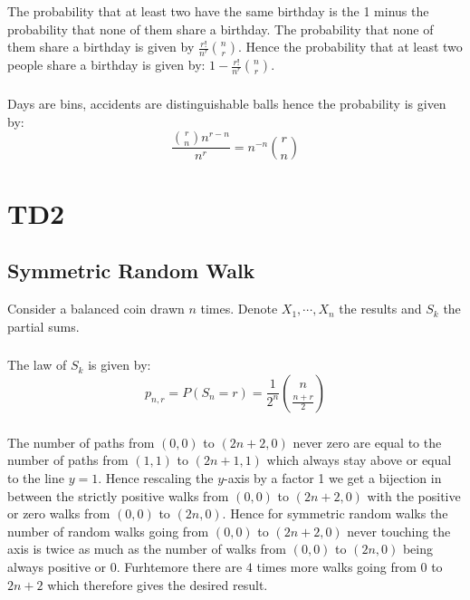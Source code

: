 \documentclass[10pt,a4paper]{book}
\begin{document}
\subsection{}
The probability that at least two have the same birthday is the 1 minus the probability that none of them share a birthday. The probability that none of them share a birthday is given by $\frac{r!}{n^r}\binom{n}{r}$. Hence the probability that at least two people share a birthday is given by: $1 - \frac{r!}{n^r} \binom{n}{r}$.

\subsection{}
Days are bins, accidents are distinguishable balls hence the probability is given by:
\[
\frac{\binom{r}{n} n^{r - n}}{n^r}  = n^{-n} \binom{r}{n}
\]

\subsection{}


\chapter{TD2}

\section{Symmetric Random Walk}
Consider a balanced coin drawn $n$ times. Denote $X_1, \cdots, X_n$ the results and $S_k$ the partial sums. 
\subsection{}
The law of $S_k$ is given by:
\[
p_{n,r} = P(S_n = r) = \frac{1}{2^n} \binom{n}{\frac{n + r}{2}}
\]

\subsection{}
The number of paths from $(0, 0)$ to $(2n +2, 0)$ never zero are equal to the number of paths from $(1, 1)$ to $(2n + 1, 1)$ which always stay above or equal to the line $y = 1$. Hence rescaling the $y$-axis by a factor 1 we get a bijection in between the strictly positive walks from $(0, 0)$ to $(2n +2, 0)$ with the positive or zero walks from $(0, 0)$ to $(2n, 0)$.
Hence for symmetric random walks the number of random walks going from $(0,0)$ to $(2n+2, 0)$ never touching the axis is twice as much as the number of walks from $(0,0)$ to $(2n, 0)$ being always positive or 0. Furhtemore there are $4$ times more walks going from $0$ to $2n+2$ which therefore gives the desired result. 
\end{document}
